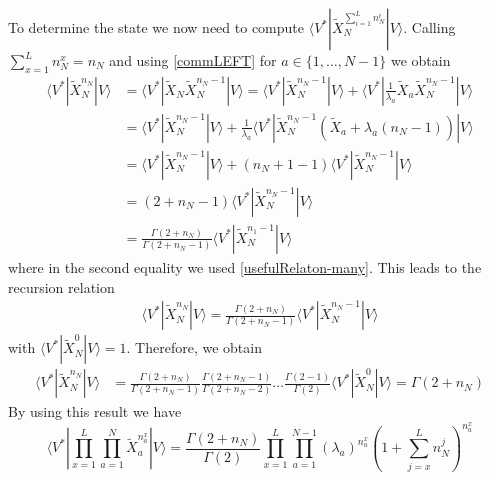 \documentclass[10pt]{article}
\numberwithin{equation}{section}
\numberwithin{equation}{subsection}
\begin{document}
To determine the state we now need to compute $\langle V^{*}|\widetilde{X}_{N}^{\sum_{i=1}^{L}n_{N}^{i}}|V\rangle$. Calling $\sum_{x=1}^{L}n_{N}^{x}=n_{N}$ and using \eqref{commLEFT} for $a\in \{1,\ldots,N-1\}$ we obtain 
\begin{align*}
	\langle V^{*}|\widetilde{X}_{N}^{n_{N}}|V\rangle&=\langle V^{*}|\widetilde{X}_{N}\widetilde{X}_{N}^{n_{N}-1}|V\rangle=\langle V^{*}|\widetilde{X}_{N}^{n_{N}-1}|V\rangle +\langle V^{*}|\frac{1}{\lambda_{a}}\widetilde{X}_{a}\widetilde{X}_{N}^{n_{N}-1}|V\rangle
	\\&=
	\langle V^{*}|\widetilde{X}_{N}^{n_{N}-1}|V\rangle+\frac{1}{\lambda_{a}}\langle V^{*}|\widetilde{X}_{N}^{n_{N}-1}\left(\widetilde{X}_{a}+\lambda_{a}(n_{N}-1)\right)|V\rangle
	\\&=
	\langle V^{*}|\widetilde{X}_{N}^{n_{N}-1}|V\rangle+\left(n_{N}+1-1\right)\langle V^{*}|\widetilde{X}_{N}^{n_{N}-1}|V\rangle
	\\&=
	\left(2+n_{N}-1\right)\langle V^{*}|\widetilde{X}_{N}^{n_{N}-1}|V\rangle
	\\&=
	\frac{\Gamma(2+n_{N})}{\Gamma(2+n_{N}-1)}\langle V^{*}|\widetilde{X}_{N}^{n_{1}-1}|V\rangle
\end{align*}
where in the second equality we used \eqref{usefulRelaton-many}. 
This leads to the recursion relation
\begin{align}
		\langle V^{*}|\widetilde{X}_{N}^{n_{N}}|V\rangle=\frac{\Gamma(2+n_{N})}{\Gamma(2+n_{N}-1)}\langle V^{*}|\widetilde{X}_{N}^{n_{N}-1}|V\rangle
\end{align}
with $	\langle V^{*}|\widetilde{X}_{N}^{0}|V\rangle=1$. 
Therefore, we obtain 
\begin{align*}
	\langle V^{*}|\widetilde{X}_{N}^{n_{N}}|V\rangle&=%
	\frac{\Gamma(2+n_{N})}{\Gamma(2+n_{N}-1)}\frac{\Gamma(2+n_{N}-1)}{\Gamma(2+n_{N}-2)}\ldots \frac{\Gamma(2-1)}{\Gamma(2)}\langle V^{*}|\widetilde{X}_{N}^{0}|V\rangle=
	\Gamma(2+n_{N})
\end{align*}
By using this result we have 
\begin{equation}
	\langle V^{*}|\prod_{x=1}^{L}\prod_{a=1}^{N}\widetilde{X}_{a}^{n_{a}^{x}}
	|V \rangle=\frac{\Gamma(2+n_{N})}{\Gamma(2)}\prod_{x=1}^{L}\prod_{a=1}^{N-1}\left(\lambda_{a}\right)^{n_{a}^{x}}\left(1+\sum_{j=x}^{L}n_{N}^{j}\right)^{n_{a}^{x}}
\end{equation}
\end{document}
